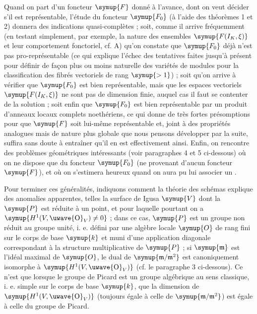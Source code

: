 Quand on part d'un foncteur $\symup{F}$ donné à l'avance, dont on veut décider s'il est
représentable, l'étude du foncteur $\symup{F_0}$ (à l'aide des théorèmes 1 et 2)
donnera des indications quasi-complètes ; soit, comme il arrive fréquemment
(en testant simplement, par exemple, la nature des ensembles
$\symup{F(I_K,\xi)}$ et leur comportement fonctoriel, cf. A) qu'on constate que
$\symup{F_0}$ déjà n'est pas pro-représentable (ce qui explique l'échec des tentatives
faites jusqu'à présent pour définir de façon plus ou moins naturelle des
variétés de modules pour la classification des fibrés vectoriels de rang
$\symup{>1}$) ; soit qu'on arrive à vérifier que $\symup{F_0}$ est bien représentable, mais
que les espaces vectoriels $\symup{F(I_K,\xi)}$ ne sont pas de dimension finie,
auquel cas il faut se contenter de la solution  ; soit enfin que
$\symup{F_0}$ est bien représentable par un produit d'anneaux locaux complets
noethériens, ce qui donne de très fortes présomptions pour que $\symup{F}$ soit
lui-même représentable et, joint à des propriétés analogues mais de nature
plus globale que nous pensons développer par la suite, suffira sans doute à
entraîner qu'il en est effectivement ainsi. Enfin, on rencontre des problèmes
géométriques intéressants (voir paragraphes 4 et 5 ci-dessous) où on ne dispose
que du foncteur $\symup{F_0}$ (ne provenant d'aucun foncteur  $\symup{F}$), et où on
s'estimera heureux quand on aura pu lui associer un .

Pour terminer ces généralités, indiquons comment la théorie des schémas
explique des anomalies apparentes, telles la surface de Igusa $\symup{V}$ dont la
 $\symup{P}$ est réduite à un point, et pour laquelle pourtant
on a $\symup{H^1(V,\text{\uwave{O}}_V)\ne 0}$ ; dans ce cas, $\symup{P}$ est un groupe  non réduit au groupe
unité, i. e. défini par une algèbre locale $\symup{O}$ de rang fini sur le corps de base
$\symup{k}$ et muni d'une application diagonale correspondant à la structure
multiplicative de $\symup{P}$ ; si $\symup{\mathfrak m}$ est l'idéal maximal de $\symup{O}$, le dual
de $\symup{\mathfrak m/\mathfrak m^2}$ est canoniquement isomorphe à
$\symup{H^1(V,\text{\uwave{O}}_V)}$ (cf. le paragraphe 3 ci-dessous). Ce n'est que lorsque le
groupe de Picard est un groupe algébrique au sens classique, i. e. simple sur le
corps de base $\symup{k}$, que la dimension de $\symup{H^1(V,\text{\uwave{O}}_V)}$ (toujours égale à
celle de $\symup{\mathfrak m/\mathfrak m^2}$) est égale à celle du groupe de Picard.

